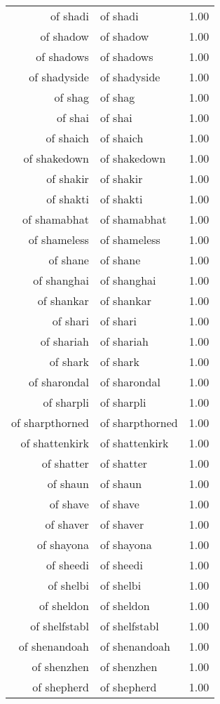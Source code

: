 \begin{table}[ht]
\begin{tabular}{rlr}
  of shadi & of shadi & 1.00 \\ 
  of shadow & of shadow & 1.00 \\ 
  of shadows & of shadows & 1.00 \\ 
  of shadyside & of shadyside & 1.00 \\ 
  of shag & of shag & 1.00 \\ 
  of shai & of shai & 1.00 \\ 
  of shaich & of shaich & 1.00 \\ 
  of shakedown & of shakedown & 1.00 \\ 
  of shakir & of shakir & 1.00 \\ 
  of shakti & of shakti & 1.00 \\ 
  of shamabhat & of shamabhat & 1.00 \\ 
  of shameless & of shameless & 1.00 \\ 
  of shane & of shane & 1.00 \\ 
  of shanghai & of shanghai & 1.00 \\ 
  of shankar & of shankar & 1.00 \\ 
  of shari & of shari & 1.00 \\ 
  of shariah & of shariah & 1.00 \\ 
  of shark & of shark & 1.00 \\ 
  of sharondal & of sharondal & 1.00 \\ 
  of sharpli & of sharpli & 1.00 \\ 
  of sharpthorned & of sharpthorned & 1.00 \\ 
  of shattenkirk & of shattenkirk & 1.00 \\ 
  of shatter & of shatter & 1.00 \\ 
  of shaun & of shaun & 1.00 \\ 
  of shave & of shave & 1.00 \\ 
  of shaver & of shaver & 1.00 \\ 
  of shayona & of shayona & 1.00 \\ 
  of sheedi & of sheedi & 1.00 \\ 
  of shelbi & of shelbi & 1.00 \\ 
  of sheldon & of sheldon & 1.00 \\ 
  of shelfstabl & of shelfstabl & 1.00 \\ 
  of shenandoah & of shenandoah & 1.00 \\ 
  of shenzhen & of shenzhen & 1.00 \\ 
  of shepherd & of shepherd & 1.00 \\ 

\end{tabular}
\end{table}
